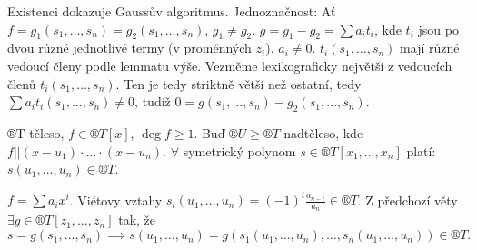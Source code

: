 \documentclass[12pt]{article}                   %
\begin{document}
    \begin{dukazin}
        Existenci dokazuje Gaussův algoritmus. Jednoznačnost: Ať $f = g_1 (s_1, …, s_n) = g_2(s_1, …, s_n)$, $g_1 ≠ g_2$. $g = g_1 - g_2 = \sum a_it_i$, kde $t_i$ jsou po dvou různé jednotlivé termy (v proměnných $z_i$), $a_i≠0$. $t_i(s_1, …, s_n)$ mají různé vedoucí členy podle lemmatu výše. Vezměme lexikograficky největší z vedoucích členů $t_i(s_1, …, s_n)$. Ten je tedy striktně větší než ostatní, tedy $\sum a_it_i(s_1, …, s_n) ≠ 0$, tudíž $0 = g(s_1, …, s_n) - g_2(s_1, …, s_n)$.
    \end{dukazin}

    \begin{dusledek}
        ®T těleso, $f \in ®T[x]$, $\deg f ≥ 1$. Buď $®U ≥ ®T$ nadtěleso, kde $f || (x - u_1)·…·(x-u_n)$. $\forall$ symetrický polynom $s \in ®T[x_1, …, x_n]$ platí: $s(u_1, …, u_n) \in ®T$.

        \begin{dukazin}
            $f = \sum a_ix^i$. Viétovy vztahy $s_i(u_1, …, u_n) = (-1)^i\frac{a_{n-i}}{a_n} \in ®T$. Z předchozí věty $\exists g \in ®T[z_1, …, z_n]$ tak, že
            $$ s = g(s_1, …, s_n) \implies s(u_1, …, u_n) = g(s_1(u_1, …, u_n), …, s_n(u_1, …, u_n)) \in ®T. $$
        \end{dukazin}
    \end{dusledek}
\end{document}
